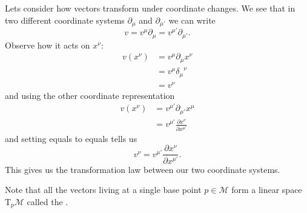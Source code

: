 Lets consider how vectors transform under coordinate
changes. We
see that in two different coordinate systems $\partial_{\mu}$ and
$\partial_{\mu'}$ we can write
\begin{equation}
v=v^{\mu}\partial_{\mu}=v^{\mu'}\partial_{\mu'}.
\end{equation}
Observe how it acts on $x^{\nu}$:
\begin{subequations}
\begin{align}
v(x^{\nu})
&=v^{\mu}\partial_{\mu}x^{\nu}\\
&=v^{\mu}{\delta_{\mu}}^{\nu}\\
&=v^{\nu}
\end{align}
\end{subequations}
and using the other coordinate representation
\begin{subequations}
\begin{align}
v(x^{\nu})
&=v^{\mu'}\partial_{\mu'}x^{\mu}\\
&=v^{\mu'}\frac{\partial x^{\nu}}{\partial x^{\mu'}}
\end{align}
\end{subequations}
and setting equals to equals tells us
\begin{equation}
v^{\nu}=v^{\mu'}\frac{\partial x^{\nu}}{\partial x^{\mu'}}.
\end{equation}
This gives us the transformation law between our two coordinate systems.

\begin{rmk}
Note that all the vectors living at a single base point
$p\in\mathcal{M}$ form a linear space $\mathrm{T}_{p}\mathcal{M}$
called the .
\end{rmk}
